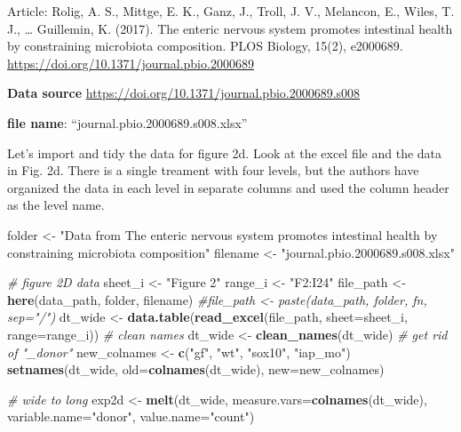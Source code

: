 \documentclass[]{book}
\newenvironment{Shaded}{\begin{snugshade}}{\end{snugshade}}
\newcommand{\KeywordTok}[1]{\textcolor[rgb]{0.13,0.29,0.53}{\textbf{#1}}}
\newcommand{\DataTypeTok}[1]{\textcolor[rgb]{0.13,0.29,0.53}{#1}}
\newcommand{\StringTok}[1]{\textcolor[rgb]{0.31,0.60,0.02}{#1}}
\newcommand{\CommentTok}[1]{\textcolor[rgb]{0.56,0.35,0.01}{\textit{#1}}}
\newcommand{\NormalTok}[1]{#1}
\begin{document}
Article: Rolig, A. S., Mittge, E. K., Ganz, J., Troll, J. V., Melancon,
E., Wiles, T. J., \ldots{} Guillemin, K. (2017). The enteric nervous
system promotes intestinal health by constraining microbiota
composition. PLOS Biology, 15(2), e2000689.
\url{https://doi.org/10.1371/journal.pbio.2000689}

\textbf{Data source}
\url{https://doi.org/10.1371/journal.pbio.2000689.s008}

\textbf{file name}: ``journal.pbio.2000689.s008.xlsx''

Let's import and tidy the data for figure 2d. Look at the excel file and
the data in Fig. 2d. There is a single treament with four levels, but
the authors have organized the data in each level in separate columns
and used the column header as the level name.

\begin{Shaded}
\begin{Highlighting}[]
\NormalTok{folder <-}\StringTok{ "Data from The enteric nervous system promotes intestinal health by constraining microbiota composition"}
\NormalTok{filename <-}\StringTok{ "journal.pbio.2000689.s008.xlsx"}

\CommentTok{# figure 2D data}
\NormalTok{sheet_i <-}\StringTok{ "Figure 2"}
\NormalTok{range_i <-}\StringTok{ "F2:I24"}
\NormalTok{file_path <-}\StringTok{ }\KeywordTok{here}\NormalTok{(data_path, folder, filename)}
\CommentTok{#file_path <- paste(data_path, folder, fn, sep="/")}
\NormalTok{dt_wide <-}\StringTok{ }\KeywordTok{data.table}\NormalTok{(}\KeywordTok{read_excel}\NormalTok{(file_path, }\DataTypeTok{sheet=}\NormalTok{sheet_i, }\DataTypeTok{range=}\NormalTok{range_i))}
\CommentTok{# clean names}
\NormalTok{dt_wide <-}\StringTok{ }\KeywordTok{clean_names}\NormalTok{(dt_wide)}
\CommentTok{# get rid of "_donor"}
\NormalTok{new_colnames <-}\StringTok{ }\KeywordTok{c}\NormalTok{(}\StringTok{"gf"}\NormalTok{, }\StringTok{"wt"}\NormalTok{, }\StringTok{"sox10"}\NormalTok{, }\StringTok{"iap_mo"}\NormalTok{)}
\KeywordTok{setnames}\NormalTok{(dt_wide, }\DataTypeTok{old=}\KeywordTok{colnames}\NormalTok{(dt_wide), }\DataTypeTok{new=}\NormalTok{new_colnames)}

\CommentTok{# wide to long}
\NormalTok{exp2d <-}\StringTok{ }\KeywordTok{melt}\NormalTok{(dt_wide, }
              \DataTypeTok{measure.vars=}\KeywordTok{colnames}\NormalTok{(dt_wide), }
              \DataTypeTok{variable.name=}\StringTok{"donor"}\NormalTok{, }
              \DataTypeTok{value.name=}\StringTok{"count"}\NormalTok{)}
\end{Highlighting}
\end{Shaded}
\end{document}
